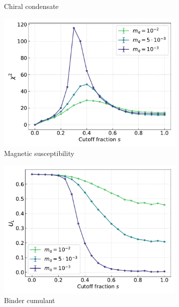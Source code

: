 \begin{figure}[h!]
\begin{subfigure}{0.49\textwidth}
    \caption{Chiral condensate}
\end{subfigure}
\begin{subfigure}{0.49\textwidth}	
	\includegraphics[width=\textwidth]{figures/chiral_PT/chi2.pdf}
    \caption{Magnetic susceptibility}
\end{subfigure}
\begin{subfigure}{0.49\textwidth}
	\includegraphics[width=\textwidth]{figures/chiral_PT/binder.pdf}
    \caption{Binder cumulant}
\end{subfigure}\\
\begin{subfigure}{0.49\textwidth}

\end{subfigure}
\end{figure}

